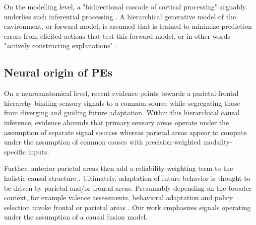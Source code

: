 On the modelling level, a "bidirectional cascade of cortical processing" arguably underlies such inferential processing \cite{Clark2013}. A hierarchical generative model of the environment, or forward model, is assumed that is trained to minimize prediction errors from elicited actions that test this forward model, or in other words "actively constructing explanations" \cites{Wolpert2011, Friston2018}.

\subsection{Neural origin of PEs} %


On a neuroanatomical level, recent evidence points towards a parietal-frontal hierarchy binding sensory signals to a common source while segregating those from diverging and guiding future adaptation. Within this hierarchical causal inference, evidence abounds that primary sensory areas operate under the assumption of separate signal sources whereas parietal areas appear to compute under the assumption of common causes with precision-weighted modality-specific inputs. 

Further, anterior parietal areas then add a reliability-weighting term to the holistic causal structure \cite{Cao2019, Rohe2019, Cohen2013a}. Ultimately, adaptation of future behavior is thought to be driven by parietal and/or frontal areas. Presumably depending on the broader context, for example valence assessments, behavioral adaptation and policy selection invoke frontal or parietal areas \cite{Pearson2011, Kolling2016, Holroyd2002}. {Our work emphasizes signals operating under the assumption of a causal fusion model}.

